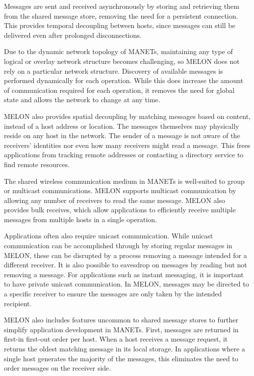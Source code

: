 \documentclass[lnicst]{svmultln}
\begin{document}
Messages are sent and received asynchronously by storing and retrieving them from the shared message store, removing the need for a persistent connection. This provides temporal decoupling between hosts, since messages can still be delivered even after prolonged disconnections.

Due to the dynamic network topology of MANETs, maintaining any type of logical or overlay network structure becomes challenging, so MELON does not rely on a particular network structure. Discovery of available messages is performed dynamically for each operation. While this does increase the amount of communication required for each operation, it removes the need for global state and allows the network to change at any time.

MELON also provides spatial decoupling by matching messages based on content, instead of a host address or location. The messages themselves may physically reside on any host in the network. The sender of a message is not aware of the receivers' identities nor even how many receivers might read a message. This frees applications from tracking remote addresses or contacting a directory service to find remote resources.

The shared wireless communication medium in MANETs is well-suited to group or multicast communications. MELON supports multicast communication by allowing any number of receivers to read the same message. MELON also provides bulk receives, which allow applications to efficiently receive multiple messages from multiple hosts in a single operation.

Applications often also require unicast communication. While unicast communication can be accomplished through by storing regular messages in MELON, these can be disrupted by a process removing a message intended for a different receiver. It is also possible to eavesdrop on messages by reading but not removing a message. For applications such as instant messaging, it is important to have private unicast communication. In MELON, messages may be directed to a specific receiver to ensure the messages are only taken by the intended recipient.

MELON also includes features uncommon to shared message stores to further simplify application development in MANETs. First, messages are returned in first-in first-out order per host. When a host receives a message request, it returns the oldest matching message in its local storage. In applications where a single host generates the majority of the messages, this eliminates the need to order messages on the receiver side. 
\end{document}
